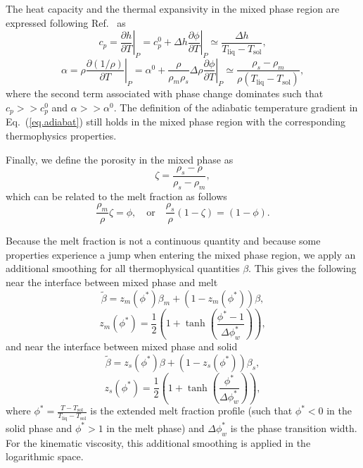 \documentclass{article}
\begin{document}
The heat capacity and the thermal expansivity in the mixed phase region are expressed following Ref.~\cite{SOLO07} as
\begin{equation}
    c_p = \left.\frac{\partial h}{\partial T}\right|_P = c_p^0 + \Delta h \left.\frac{\partial \phi}{\partial T}\right|_P \simeq \frac{\Delta h}{T_\mathrm{liq}- T_\mathrm{sol}},
\end{equation}
\begin{equation}
    \alpha = \rho\left.\frac{\partial (1/\rho)}{\partial T}\right|_P = \alpha^0 + \frac{\rho}{\rho_m\rho_s} \Delta \rho \left.\frac{\partial \phi}{\partial T}\right|_P \simeq \frac{\rho_s-\rho_m}{\rho (T_\mathrm{liq}- T_\mathrm{sol}) },
\end{equation}
where the second term associated with phase change dominates such that $c_p>>c_p^0$ and $ \alpha>> \alpha^0$. The definition of the adiabatic temperature gradient in Eq.~(\ref{eq.adiabat}) still holds in the mixed phase region with the corresponding thermophysics properties.

Finally, we define the porosity in the mixed phase as
\begin{equation}
    \zeta = \frac{\rho_s-\rho}{\rho_s-\rho_m},
\end{equation}
which can be related to the melt fraction as follows
\begin{equation}
    \frac{\rho_m}{\rho}\zeta = \phi, \quad \mathrm{or} \quad \frac{\rho_s}{\rho}(1-\zeta) = (1-\phi).
\end{equation}

Because the melt fraction is not a continuous quantity and because some properties experience a jump when entering the mixed phase region, we apply an additional smoothing for all thermophysical quantities $\beta$. This gives the following near the interface between mixed phase and melt
\begin{equation}
    \widetilde{\beta} = z_m(\phi^*)\beta_m + (1-z_m(\phi^*))\beta,
\end{equation}
\begin{equation}
z_m(\phi^*)=\frac{1}{2}\left(1+\tanh\left( \frac{\phi^*-1}{\Delta\phi_w^*}\right) \right),
\end{equation}
and near the interface between mixed phase and solid
\begin{equation}
    \widetilde{\beta} = z_s(\phi^*)\beta + (1-z_s(\phi^*))\beta_s,
\end{equation}
\begin{equation}
z_s(\phi^*)=\frac{1}{2}\left(1+\tanh\left( \frac{\phi^*}{\Delta\phi_w^*}\right) \right),
\end{equation}
where $\phi^*= \frac{T-T_\mathrm{sol}}{T_\mathrm{liq}-T_\mathrm{sol}}$ is the extended melt fraction profile (such that $\phi^*<0$ in the solid phase and $\phi^*>1$ in the melt phase) and $\Delta\phi_w^*$ is the phase transition width. For the kinematic viscosity, this additional smoothing is applied in the logarithmic space.
\end{document}
